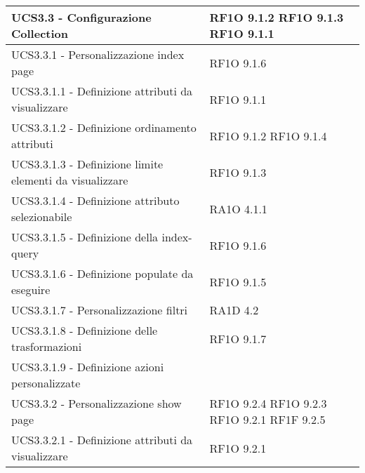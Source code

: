\begin{center}
\begin{longtable}{ | p{5cm} | p{5cm} |}
            UCS3.3 - Configurazione Collection &  RF1O 9.1.2  \newline  RF1O 9.1.3  \newline  RF1O 9.1.1  \newline  \\ \hline      
            UCS3.3.1 - Personalizzazione index page &  RF1O 9.1.6 \newline  \\ \hline      
            UCS3.3.1.1 - Definizione attributi da visualizzare &  RF1O 9.1.1  \newline  \\ \hline      
            UCS3.3.1.2 - Definizione ordinamento attributi &  RF1O 9.1.2  \newline  RF1O 9.1.4  \newline  \\ \hline      
            UCS3.3.1.3 - Definizione limite elementi da visualizzare &  RF1O 9.1.3  \newline  \\ \hline      
            UCS3.3.1.4 - Definizione attributo selezionabile &  RA1O 4.1.1  \newline  \\ \hline      
            UCS3.3.1.5 - Definizione della index-query &  RF1O 9.1.6 \newline  \\ \hline      
            UCS3.3.1.6 - Definizione populate da eseguire &  RF1O 9.1.5 \newline  \\ \hline      
            UCS3.3.1.7 - Personalizzazione filtri &  RA1D 4.2  \newline  \\ \hline      
            UCS3.3.1.8 - Definizione delle trasformazioni &  RF1O 9.1.7 \newline  \\ \hline      
            UCS3.3.1.9 - Definizione azioni personalizzate &  \\ \hline      
            UCS3.3.2 - Personalizzazione show page &  RF1O 9.2.4 \newline  RF1O 9.2.3 \newline  RF1O 9.2.1  \newline  RF1F 9.2.5 \newline  \\ \hline      
            UCS3.3.2.1 - Definizione attributi da visualizzare &  RF1O 9.2.1  \newline  \\ \hline      

\end{longtable}
\end{center}

